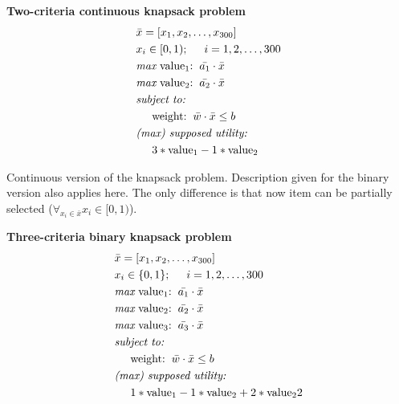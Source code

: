 \begin{description}
  \item{\textbf{Two-criteria continuous knapsack problem}}
    \begin{align*}
      & \bar{x} = [x_1, x_2, \dots, x_{300}]  \\
      & x_i \in [0, 1);  \hspace{0.5cm} i = 1, 2, \dots, 300 \\
      & \textit{max}\text{ value$_1$:} \hspace{0.2cm} \bar{a_1} \cdot \bar{x} \\
      & \textit{max}\text{ value$_2$:} \hspace{0.2cm} \bar{a_2} \cdot \bar{x} \\
      & \textit{subject to:} \\
      & \hspace{0.5cm} \text{weight:}  \hspace{0.2cm} \bar{w} \cdot \bar{x}
        \leq b \\
      & \textit{(max) supposed utility:} \\
      & \hspace{0.5cm} 3 * \text{value}_1 - 1 * \text{value}_2
    \end{align*}

    Continuous version of the knapsack problem. Description given for the
    binary version also applies here. The only difference is that now item can
    be partially selected ($\forall_{x_i \in \bar{x}} x_i \in [0, 1)$). 

  \item{\textbf{Three-criteria binary knapsack problem}}
    \begin{align*}
      & \bar{x} = [x_1, x_2, \dots, x_{300}]  \\
      & x_i \in \{0, 1\};  \hspace{0.5cm} i = 1, 2, \dots, 300 \\
      & \textit{max}\text{ value$_1$:} \hspace{0.2cm} \bar{a_1} \cdot \bar{x} \\
      & \textit{max}\text{ value$_2$:} \hspace{0.2cm} \bar{a_2} \cdot \bar{x} \\
      & \textit{max}\text{ value$_3$:} \hspace{0.2cm} \bar{a_3} \cdot \bar{x} \\
      & \textit{subject to:} \\
      & \hspace{0.5cm} \text{weight:} \hspace{0.2cm} \bar{w} \cdot \bar{x}
      \leq b \\
      & \textit{(max) supposed utility:} \\
      & \hspace{0.5cm} 1 * \text{value}_1 - 1 * \text{value}_2 + 2 * \text{value}_22
    \end{align*}


\end{description}
